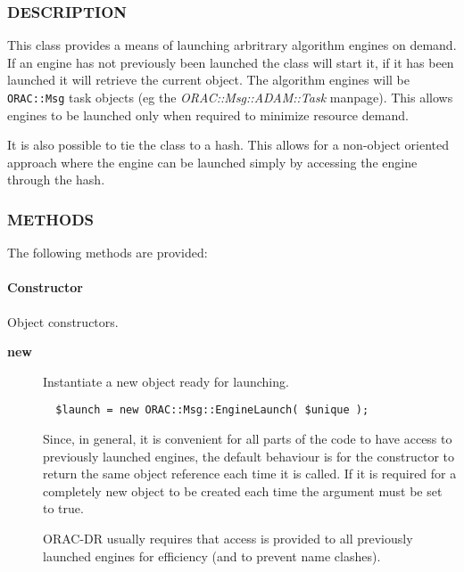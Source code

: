 \subsubsection*{DESCRIPTION\label{ORAC::Msg::EngineLaunch_DESCRIPTION}}

This class provides a means of launching arbritrary algorithm
engines on demand. If an engine has not previously been
launched the class will start it, if it has been launched it
will retrieve the current object. The algorithm engines will
be \texttt{ORAC::Msg} task objects (eg the \emph{ORAC::Msg::ADAM::Task} manpage).
This allows engines to be launched only when required to minimize
resource demand.



It is also possible to tie the class to a hash. This allows
for a non-object oriented approach where the engine can be launched
simply by accessing the engine through the hash.

\subsubsection*{METHODS\label{ORAC::Msg::EngineLaunch_METHODS}}

The following methods are provided:

\paragraph*{Constructor\label{ORAC::Msg::EngineLaunch_Constructor}}

Object constructors.

\begin{description}
\item[\textbf{new}] \mbox{}

Instantiate a new object ready for launching.

\begin{verbatim}
  $launch = new ORAC::Msg::EngineLaunch( $unique );
\end{verbatim}


Since, in general, it is convenient for all parts of the code
to have access to previously launched engines, the default
behaviour is for the constructor to return the same object reference
each time it is called. If it is required for a completely new object
to be created each time the argument must be set to true.



ORAC-DR usually requires that access is provided to all previously
launched engines for efficiency (and to prevent name clashes).

\end{description}
